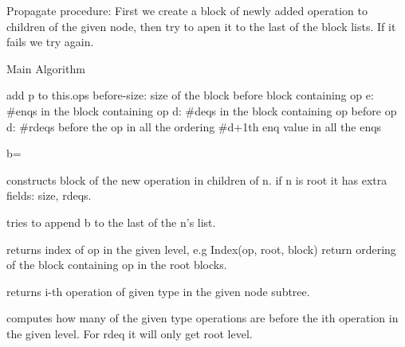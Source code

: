 \documentclass[10pt,table]{article}
\theoremstyle{definition}
\begin{document}
Propagate procedure: First we create a block of newly added operation to children of the given node, then try to apen it to the last of the block lists. If it fails we try again.



\begin{algorithm}
\caption{Main Algorithm}\label{alg}
\begin{algorithmic}[1]
\onehalfspacing


\State add p to this.ops
\State {}
\State {}
\State before-size: size of the block before block containing op
\State e: \#enqs in the block containing op
\State d: \#deqs in the block containing op before op
\State {}
\Else{}
\State d: \#rdeqs before the op in all the ordering
\State {} \#d+1th enq value in all the enqs
\EndIf
\EndIf
\EndFunction
\Statex

\State b=
\EndIf
\State {}
\EndFunction
\Statex

\Statex \Comment constructs block of the new operation in children of n. if n is root it has extra fields: size, rdeqs.
\EndFunction
\Statex

\Statex \Comment tries to append b to the last of the n's list.
\EndFunction
\Statex

\Statex \Comment returns index of op in the given level, e.g  Index(op, root, block) return ordering of the block containing op in the root blocks.
\EndFunction
\Statex

\Statex \Comment returns i-th operation of given type in the given node subtree.
\EndFunction
\Statex

\Statex \Comment computes how many of the given type operations are before the ith operation in the given level. For rdeq it will only get root level.
\EndFunction


\end{algorithmic}
\end{algorithm}
\pagebreak
\end{document}
